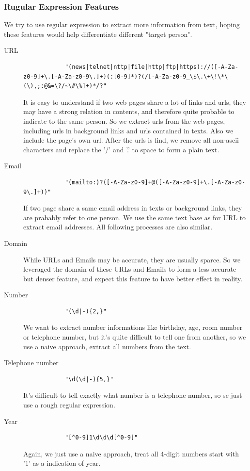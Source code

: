 \documentclass{article}
\begin{document}
\begin{CJK}{UTF8}{gbsn}
        \subsubsection{Rugular Expression Features}
            We try to use regular expression to extract more information from text, hoping these features would help differentiate different "target person".
            \begin{description}
            \item [URL] 
            \begin{verbatim} 
            "(news|telnet|nttp|file|http|ftp|https)://([-A-Za-z0-9]+\.[-A-Za-z0-9\.]+)(:[0-9]*)?(/[-A-Za-z0-9_\$\.\+\!\*\(\),;:@&=\?/~\#\%]+)*/?"
            \end{verbatim} 
            It is easy to understand if two web pages share a lot of links and urls, they may have a strong relation in contents, and therefore quite probable to indicate to the same person.
            So we extract urls from the web pages, including urls in background links and urls contained in texts. 
            Also we include the page's own url. 
            After the urls is find, we remove all non-ascii characters and replace the '/' and '.' to space to form a plain text.
            \item [Email]
            \begin{verbatim} 
            "(mailto:)?([-A-Za-z0-9]+@([-A-Za-z0-9]+\.[-A-Za-z0-9\.]+))"
            \end{verbatim} 
            If two page share a same email address in texts or background links, they are prabably refer to one person. We use the same text base as for URL to extract email addresses. All following processes are also similar.
            \item [Domain]
            While URLs and Emails may be accurate, they are usually sparce. So we leveraged the domain of these URLs and Emails to form a less accurate but denser feature, and expect this feature to have better effect in reality.
            \item [Number]
            \begin{verbatim} 
            "(\d|-){2,}"
            \end{verbatim} 
            We want to extract number informations like birthday, age, room number or telephone number, but it's quite difficult to tell one from another, so we use a naive approach, extract all numbers from the text.
            \item [Telephone number]
            \begin{verbatim} 
            "\d(\d|-){5,}"
            \end{verbatim} 
            It's difficult to tell exactly what number is a telephone number, so se just use a rough regular expression.
            \item [Year]
            \begin{verbatim} 
            "[^0-9]1\d\d\d[^0-9]"
            \end{verbatim} 
            Again, we just use a naive approach, treat all 4-digit numbers start with '1' as a indication of year.
            \end{description}


\end{CJK}
\end{document}
